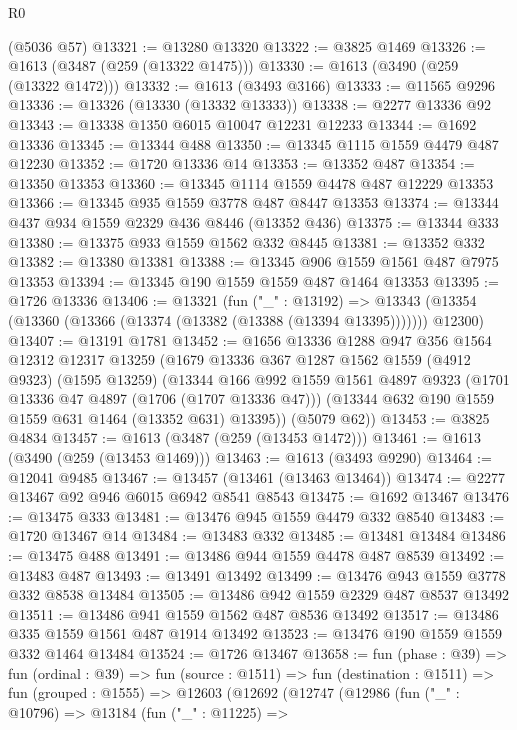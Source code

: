\begin{lexlean}{R0}
\begin{coremodule}
    (@5036 @57)
@13321 := @13280 @13320
@13322 := @3825 @1469
@13326 := @1613 (@3487 (@259 (@13322 @1475)))
@13330 := @1613 (@3490 (@259 (@13322 @1472)))
@13332 := @1613 (@3493 @3166)
@13333 := @11565 @9296
@13336 := @13326 (@13330 (@13332 @13333))
@13338 := @2277 @13336 @92
@13343 := @13338 @1350 @6015 @10047 @12231 @12233
@13344 := @1692 @13336
@13345 := @13344 @488
@13350 := @13345 @1115 @1559 @4479 @487 @12230
@13352 := @1720 @13336 @14
@13353 := @13352 @487
@13354 := @13350 @13353
@13360 := @13345 @1114 @1559 @4478 @487 @12229 @13353
@13366 := @13345 @935 @1559 @3778 @487 @8447 @13353
@13374 := @13344 @437 @934 @1559 @2329 @436 @8446 (@13352 @436)
@13375 := @13344 @333
@13380 := @13375 @933 @1559 @1562 @332 @8445
@13381 := @13352 @332
@13382 := @13380 @13381
@13388 := @13345 @906 @1559 @1561 @487 @7975 @13353
@13394 := @13345 @190 @1559 @1559 @487 @1464 @13353
@13395 := @1726 @13336
@13406 := @13321
    (fun ("_" : @13192) =>
    @13343 (@13354 (@13360 (@13366 (@13374 (@13382 (@13388 (@13394 @13395))))))) @12300)
@13407 := @13191 @1781
@13452 := @1656
    @13336
    @1288
    @947
    @356
    @1564
    @12312
    @12317
    @13259
    (@1679
      @13336
      @367
      @1287
      @1562
      @1559
      (@4912 @9323)
      (@1595 @13259)
      (@13344
        @166
        @992
        @1559
        @1561
        @4897
        @9323
        (@1701 @13336 @47 @4897 (@1706 (@1707 @13336 @47)))
        (@13344 @632 @190 @1559 @1559 @631 @1464 (@13352 @631) @13395))
      (@5079 @62))
@13453 := @3825 @4834
@13457 := @1613 (@3487 (@259 (@13453 @1472)))
@13461 := @1613 (@3490 (@259 (@13453 @1469)))
@13463 := @1613 (@3493 @9290)
@13464 := @12041 @9485
@13467 := @13457 (@13461 (@13463 @13464))
@13474 := @2277 @13467 @92 @946 @6015 @6942 @8541 @8543
@13475 := @1692 @13467
@13476 := @13475 @333
@13481 := @13476 @945 @1559 @4479 @332 @8540
@13483 := @1720 @13467 @14
@13484 := @13483 @332
@13485 := @13481 @13484
@13486 := @13475 @488
@13491 := @13486 @944 @1559 @4478 @487 @8539
@13492 := @13483 @487
@13493 := @13491 @13492
@13499 := @13476 @943 @1559 @3778 @332 @8538 @13484
@13505 := @13486 @942 @1559 @2329 @487 @8537 @13492
@13511 := @13486 @941 @1559 @1562 @487 @8536 @13492
@13517 := @13486 @335 @1559 @1561 @487 @1914 @13492
@13523 := @13476 @190 @1559 @1559 @332 @1464 @13484
@13524 := @1726 @13467
@13658 := fun (phase : @39) =>
  fun (ordinal : @39) =>
  fun (source : @1511) =>
  fun (destination : @1511) =>
  fun (grouped : @1555) =>
  @12603
    (@12692
      (@12747
        (@12986
          (fun ("_" : @10796) =>
          @13184
            (fun ("_" : @11225) =>

\end{coremodule}
\end{lexlean}
